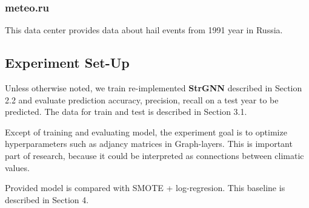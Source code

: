 \documentclass{article}
\begin{document}
\subsubsection{meteo.ru}
This data center provides data about hail events from 1991 year in Russia.
\subsection{Experiment Set-Up}
Unless otherwise noted, we train re-implemented \textbf{StrGNN} described in Section 2.2 and evaluate prediction accuracy, precision, recall on a test year to be predicted. The data for train and test is described in Section 3.1.

Except of training and evaluating model, the experiment goal is to optimize hyperparameters such as adjancy matrices in Graph-layers. This is important part of research, because it could be interpreted as connections between climatic values. 

Provided model is compared with SMOTE + log-regresion. This baseline is described in Section 4.
\end{document}

